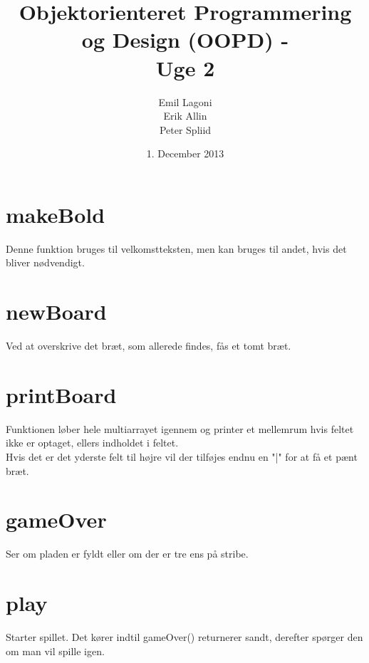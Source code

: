 \documentclass[a4paper,12pt]{article}
\title{Objektorienteret Programmering og Design (OOPD) - \\ Uge 2}
\author{Emil Lagoni \\ Erik Allin \\ Peter Spliid}
\date{1. December 2013}
\begin{document}
\maketitle %
\thispagestyle{empty}
\setcounter{page}{0}
\newpage



\section*{makeBold}
Denne funktion bruges til velkomstteksten, men kan bruges til andet, hvis det
bliver nødvendigt.


\section*{newBoard}
Ved at overskrive det bræt, som allerede findes, fås et tomt bræt.


\section*{printBoard}
Funktionen løber hele multiarrayet igennem og printer et mellemrum hvis feltet
ikke er optaget, ellers indholdet i feltet.\\
Hvis det er det yderste felt til højre vil der tilføjes endnu en "|" for at få
et pænt bræt.


\section*{gameOver}
Ser om pladen er fyldt eller om der er tre ens på stribe.




\section*{play}
Starter spillet. Det kører indtil gameOver() returnerer sandt, derefter spørger
den om man vil spille igen.
\end{document}
